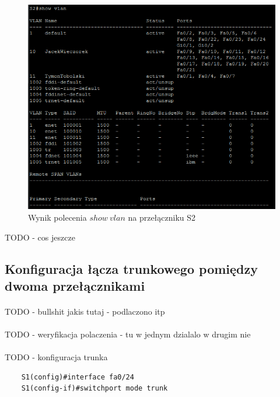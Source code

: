 \documentclass[wide,a4paper,titlepage,12pt] {article}
\begin{document}
  \begin{figure}[htbp]
    \begin{center}
      \includegraphics[width=\textwidth]{img/t8.PNG}
      \caption{Wynik polecenia $show\ vlan$ na przełączniku S2}
    \end{center}
  \end{figure}

  TODO - cos jeszcze

  \subsection{Konfiguracja łącza trunkowego pomiędzy dwoma przełącznikami}
  \paragraph{}
  TODO - bullshit jakis tutaj - podlaczono itp


  \paragraph{}
  TODO - weryfikacja polaczenia - tu w jednym dzialalo w drugim nie

  \paragraph{}
  TODO - konfiguracja trunka

  \begin{verbatim}
    S1(config)#interface fa0/24
    S1(config-if)#switchport mode trunk
  \end{verbatim}
\end{document}
